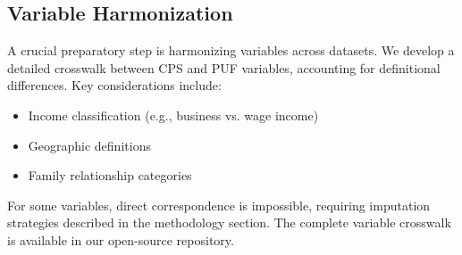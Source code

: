 \subsection{Variable Harmonization}

A crucial preparatory step is harmonizing variables across datasets. We develop a detailed crosswalk between CPS and PUF variables, accounting for definitional differences. Key considerations include:
\begin{itemize}
    \item Income classification (e.g., business vs. wage income)
    \item Geographic definitions
    \item Family relationship categories
\end{itemize}

For some variables, direct correspondence is impossible, requiring imputation strategies described in the methodology section. The complete variable crosswalk is available in our open-source repository.